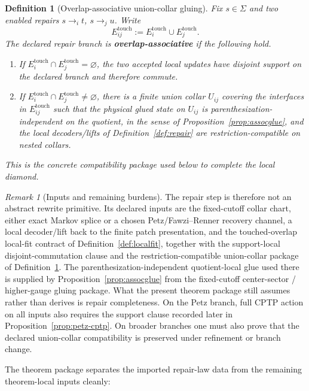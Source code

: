 \documentclass[11pt]{article}
\newtheorem{definition}[theorem]{Definition}
\theoremstyle{remark}
\newtheorem{remark}[theorem]{Remark}
\theoremstyle{plain}
\begin{document}
\begin{definition}[Overlap-associative union-collar gluing]\label{def:assoc}
Fix \(s\in\Sigma\) and two enabled repairs \(s\to_i t\), \(s\to_j u\). Write
\[
E_{ij}^{\mathrm{touch}}
:=
E_i^{\mathrm{touch}}\cup E_j^{\mathrm{touch}}.
\]
The declared repair branch is \textbf{overlap-associative} if the following hold.
\begin{enumerate}[label=(\roman*),leftmargin=2em]
\item If \(E_i^{\mathrm{touch}}\cap E_j^{\mathrm{touch}}=\varnothing\), the two accepted local
updates have disjoint support on the declared branch and therefore commute.
\item If \(E_i^{\mathrm{touch}}\cap E_j^{\mathrm{touch}}\neq\varnothing\), there is a finite union
collar \(U_{ij}\) covering the interfaces in \(E_{ij}^{\mathrm{touch}}\) such that the physical
glued state on \(U_{ij}\) is parenthesization-independent on the quotient, in the sense of
Proposition~\ref{prop:assocglue}, and the local decoders/lifts of
Definition~\ref{def:repair} are restriction-compatible on nested collars.
\end{enumerate}
This is the concrete compatibility package used below to complete the local diamond.
\end{definition}

\begin{remark}[Inputs and remaining burdens]\label{rem:repair-burdens}
The repair step is therefore not an abstract rewrite primitive. Its declared inputs are the
fixed-cutoff collar chart, either exact Markov splice or a chosen Petz/Fawzi--Renner recovery
channel, a local decoder/lift back to the finite patch presentation, and the touched-overlap
local-fit contract of Definition~\ref{def:localfit}, together with the support-local
disjoint-commutation clause and the restriction-compatible union-collar package of
Definition~\ref{def:assoc}. The
parenthesization-independent quotient-local glue used there is supplied by
Proposition~\ref{prop:assocglue} from the fixed-cutoff center-sector / higher-gauge gluing
package. What the present theorem package still assumes rather than derives is repair
completeness. On the Petz branch, full CPTP action on all inputs also requires the support clause
recorded later in Proposition~\ref{prop:petz-cptp}. On broader branches one must also prove that
the declared union-collar compatibility is preserved under refinement or branch change.
\end{remark}

The theorem package separates the imported repair-law data from the remaining theorem-local inputs cleanly:
\end{document}

